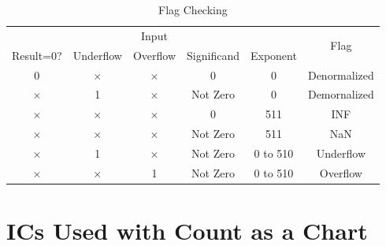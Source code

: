 \documentclass[a4paper,12pt]{article}
\begin{document}
\begin{table}[H]
    \centering
    \begin{tabular}{|ccccc|c|}
        \hline
        \multicolumn{5}{|c|}{Input}     & \multirow{2}{*}{Flag}                                                                                                                                                 \\ \cline{1-5}
        \multicolumn{1}{|l|}{Result=0?} & \multicolumn{1}{l|}{Underflow} & \multicolumn{1}{l|}{Overflow} & \multicolumn{1}{l|}{Significand} & \multicolumn{1}{l|}{Exponent} &                                   \\ \hline
        \multicolumn{1}{|c|}{0}         & \multicolumn{1}{c|}{$\times$}  & \multicolumn{1}{c|}{$\times$} & \multicolumn{1}{c|}{0}           & 0                             & \multicolumn{1}{l|}{Denormalized} \\ \hline
        \multicolumn{1}{|c|}{$\times$}  & \multicolumn{1}{c|}{1}         & \multicolumn{1}{c|}{$\times$} & \multicolumn{1}{c|}{Not Zero}    & 0                             & \multicolumn{1}{l|}{Demornalized} \\ \hline
        \multicolumn{1}{|c|}{$\times$}  & \multicolumn{1}{c|}{$\times$}  & \multicolumn{1}{c|}{$\times$} & \multicolumn{1}{c|}{0}           & 511                           & INF                               \\ \hline
        \multicolumn{1}{|c|}{$\times$}  & \multicolumn{1}{c|}{$\times$}  & \multicolumn{1}{c|}{$\times$} & \multicolumn{1}{c|}{Not Zero}    & 511                           & NaN                               \\ \hline
        \multicolumn{1}{|c|}{$\times$}  & \multicolumn{1}{c|}{1}         & \multicolumn{1}{c|}{$\times$} & \multicolumn{1}{c|}{Not Zero}    & 0 to 510                      & Underflow                         \\ \hline
        \multicolumn{1}{|c|}{$\times$}  & \multicolumn{1}{c|}{$\times$}  & \multicolumn{1}{c|}{1}        & \multicolumn{1}{c|}{Not Zero}    & 0 to 510                      & Overflow                          \\ \hline
    \end{tabular}
    \caption{Flag Checking}
\end{table}

\section{ICs Used with Count as a Chart}
\end{document}
